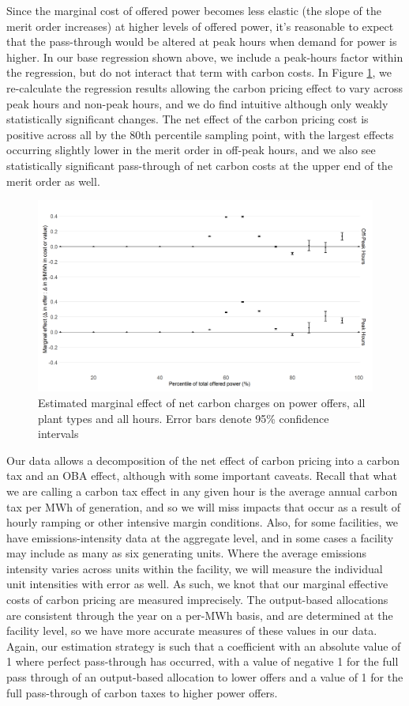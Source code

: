 \documentclass[12pt]{article}
\begin{document}
Since the marginal cost of offered power becomes less elastic (the slope of the merit order increases) at higher levels of offered power, it's reasonable to expect that the pass-through would be altered at peak hours when demand for power is higher. In our base regression shown above, we include a peak-hours factor within the regression, but do not interact that term with carbon costs. In Figure \ref{fig:net_peak}, we re-calculate the regression results allowing the carbon pricing effect to vary across peak hours and non-peak hours, and we do find intuitive although only weakly statistically significant changes. The net effect of the carbon pricing cost is positive across all by the 80th percentile sampling point, with the largest effects occurring slightly lower in the merit order in off-peak hours, and we also see statistically significant pass-through of net carbon costs at the upper end of the merit order as well.

\begin{figure}[t]
    \centering
     \includegraphics[width=.9\textwidth]{../images/all_plants_net_peak.png}
    \caption{Estimated marginal effect of net carbon charges on power offers, all plant types and all hours. Error bars denote 95\% confidence intervals}
    \label{fig:net_peak}
\end{figure}


Our data allows a decomposition of the net effect of carbon pricing into a carbon tax and an OBA effect, although with some important caveats. Recall that what we are calling a carbon tax effect in any given hour is the average annual carbon tax per MWh of generation, and so we will miss impacts that occur as a result of hourly ramping or other intensive margin conditions. Also, for some facilities, we have emissions-intensity data at the aggregate level, and in some cases a facility may include as many as six generating units. Where the average emissions intensity varies across units within the facility, we will measure the individual unit intensities with error as well. As such, we knot that our marginal effective costs of carbon pricing are measured imprecisely. The output-based allocations are consistent through the year on a per-MWh basis, and are determined at the facility level, so we have more accurate measures of these values in our data. Again, our estimation strategy is such that a coefficient with an absolute value of 1 where perfect pass-through has occurred, with a value of negative 1 for the full pass through of an output-based allocation to lower offers and a value of 1 for the full pass-through of carbon taxes to higher power offers.
\end{document}
